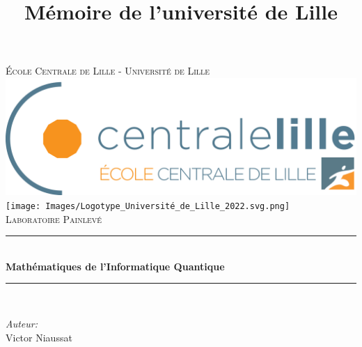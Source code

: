 \documentclass{article}
\title{Mémoire de l'université de Lille}
\begin{document}
\begin{titlepage}

\newcommand{\HRule}{\rule{\linewidth}{0.5mm}} %

\center
 

\textsc{\LARGE \'E{}cole Centrale de Lille - Université de Lille}\\[1.5cm] 
\includegraphics[scale=0.1]{Images/Centrale_Lille.png}\\[2cm]
\texttt{[image: Images/Logotype\_Université\_de\_Lille\_2022.svg.png]}\\[2cm]


\textsc{\Large Laboratoire Painlevé }\\[0.5cm] 


\HRule \\[0.4cm]
{ \huge \bfseries Mathématiques de l'Informatique Quantique}\\[0.4cm] 
\large 
\HRule \\[1.5cm]
 

\begin{minipage}{0.4\textwidth}
\begin{flushleft} \large
\emph{Auteur:}\\
Victor Niaussat \\ 




\end{flushleft}
\end{minipage}
\end{titlepage}
\end{document}
